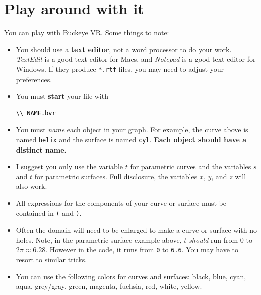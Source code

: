 \documentclass{ximera}
\begin{document}
\section{Play around with it}
You can play with Buckeye VR.  Some things to note:
\begin{itemize}
\item You should use a \textbf{text editor}, not a word processor to
  do your work. \textit{TextEdit} is a good text editor for Macs, and
  \textit{Notepad} is a good text editor for Windows. If they produce
  \texttt{*.rtf} files, you may need to adjust your preferences.
\item You must \textbf{start} your file with
\begin{verbatim}
\\ NAME.bvr
\end{verbatim}
  \item You must \textit{name} each object in your graph. For example,
    the curve above is named \verb|helix| and the surface is named
    \verb|cyl|. \textbf{Each object should have a distinct name.}
  \item I suggest you only use the variable $t$ for parametric curves
    and the variables $s$ and $t$ for parametric surfaces. Full
    disclosure, the variables $x$, $y$, and $z$ will also work.
  \item All expressions for the components of your curve or surface
    must be contained in \verb|(| and \verb|)|.
  \item Often the domain will need to be enlarged to make a curve or
    surface with no holes. Note, in the parametric surface example
    above, $t$ \textit{should} run from $0$ to $2\pi\approx
    6.28$. However in the code, it runs from \verb|0| to
    \verb|6.6|. You may have to resort to similar tricks.
  \item You can use the following colors for curves and surfaces: black, blue,
    cyan, aqua, grey/gray, green, magenta, fuchsia, red, white,
    yellow. 
\end{itemize}
\end{document}
